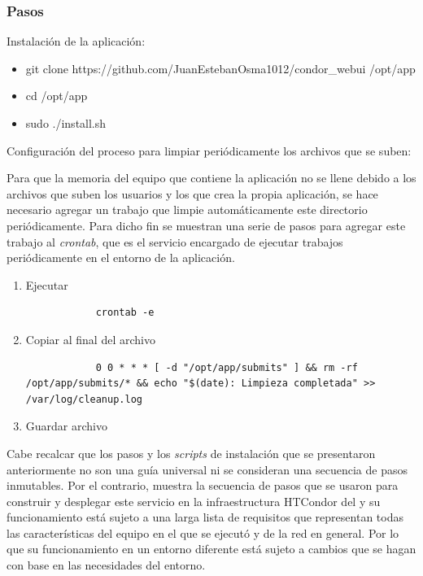\subsubsection{Pasos}
\noindent

Instalación de la aplicación:

\begin{itemize}
	\item git clone https://github.com/JuanEstebanOsma1012/condor\_webui /opt/app
	\item cd /opt/app
	\item sudo ./install.sh
\end{itemize}

Configuración del proceso para limpiar periódicamente los archivos que se suben:

Para que la memoria del equipo que contiene la aplicación no se llene debido a los archivos que suben los usuarios y los que crea la propia aplicación, se hace necesario agregar un trabajo que limpie automáticamente este directorio periódicamente. Para dicho fin se muestran una serie de pasos para agregar este trabajo al \textit{crontab}, que es el servicio encargado de ejecutar trabajos periódicamente en el entorno de la aplicación.

\begin{enumerate}
	\item Ejecutar
	      \begin{verbatim}
			crontab -e
		\end{verbatim}
	\item Copiar al final del archivo
	      \begin{verbatim}
			0 0 * * * [ -d "/opt/app/submits" ] && rm -rf /opt/app/submits/* && echo "$(date): Limpieza completada" >> /var/log/cleanup.log
		\end{verbatim}
	\item Guardar archivo
\end{enumerate}

Cabe recalcar que los pasos y los \textit{scripts} de instalación que se presentaron anteriormente no son una guía universal ni se consideran una secuencia de pasos inmutables. Por el contrario, muestra la secuencia de pasos que se usaron para construir y desplegar este servicio en la infraestructura HTCondor del \GRID y su funcionamiento está sujeto a una larga lista de requisitos que representan todas las características del equipo en el que se ejecutó y de la red en general. Por lo que su funcionamiento en un entorno diferente está sujeto a cambios que se hagan con base en las necesidades del entorno.
